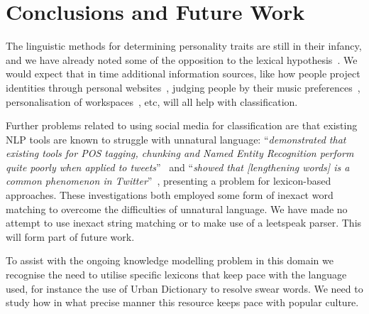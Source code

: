 \documentclass{AISB2008}
\begin{document}
\section{Conclusions and Future Work}

The linguistic methods for determining personality traits are still in
their infancy, and we have already noted some of the opposition to the
lexical hypothesis~\cite{block:2010}. We would expect that in time
additional information sources, like how people project identities
through personal websites~\cite{vazire+gosling:2004}, judging people
by their music preferences~\cite{rentfrow+gosling:2006},
personalisation of workspaces~\cite{wells+thelen:2002}, etc, will all
help with classification.

Further problems related to using social media for classification are
that existing NLP tools are known to struggle with unnatural language:
``{\emph{demonstrated that existing tools for POS tagging, chunking
and Named Entity Recognition perform quite poorly when applied to
tweets}}''~\cite{ritter-et-al:2011} and ``{\emph{showed that
[lengthening words] is a common phenomenon in
Twitter}}''~\cite{brody+diakopoulos:2011}, presenting a problem for
lexicon-based approaches. These investigations both employed some form
of inexact word matching to overcome the difficulties of unnatural
language. We have made no attempt to use inexact string matching or to
make use of a leetspeak parser. This will form part of future work.

To assist with the ongoing knowledge modelling problem in this domain
we recognise the need to utilise specific lexicons that keep pace with
the language used, for instance the use of Urban Dictionary to resolve
swear words. We need to study how in what precise manner this resource
keeps pace with popular culture.


\end{document}
